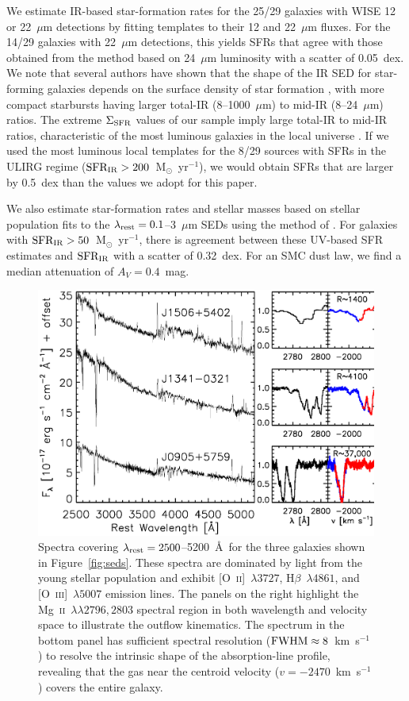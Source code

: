 \documentclass[apj]{emulateapj}
\newcommand{\kms}{km~s$^{-1}$}
\newcommand{\mgii}{\textrm{Mg}~\textsc{ii}}
\newcommand{\oii}{[\textrm{O}~\textsc{ii}]}
\newcommand{\oiii}{[\textrm{O}~\textsc{iii}]}
\newcommand{\msun}{M$_{\odot}$}
\newcommand{\lrest}{\lambda_{\textnormal{\scriptsize{rest}}}}
\newcommand{\sigmasfr}{\Sigma_{\textnormal{\scriptsize{SFR}}}}
\newcommand{\sfrir}{\textnormal{SFR}_{\textnormal{\scriptsize{IR}}}}
\begin{document}
We estimate IR-based star-formation rates for the 25/29 galaxies with
WISE 12 or 22~$\mu$m detections by fitting \citet{cha01} templates to
their 12 and 22~$\mu$m fluxes.  For the 14/29 galaxies with 22~$\mu$m
detections, this yields SFRs that agree with those obtained from the
\citet{ruj12} method based on 24~$\mu$m luminosity with a scatter of
0.05~dex.  We note that several authors have shown that the shape of
the IR SED for star-forming galaxies depends on the surface density of
star formation \citep[e.g.,][]{ruj11,elb11}, with more compact
starbursts having larger total-IR (8--1000~$\mu$m) to mid-IR
(8--24~$\mu$m) ratios.  The extreme $\sigmasfr$ values of our sample
imply large total-IR to mid-IR ratios, characteristic of the most
luminous galaxies in the local universe
\citep[e.g.,][]{cha01,dal02,rie09}.  If we used the most luminous
local templates for the 8/29 sources with SFRs in the ULIRG regime
($\sfrir>200$~\msun~yr$^{-1}$), we would obtain SFRs that are larger
by 0.5~dex than the values we adopt for this paper.

We also estimate star-formation rates and stellar masses based on
stellar population fits to the $\lrest=0.1$--3~$\mu$m SEDs using the
method of \citet{mou11}.  For galaxies with
$\sfrir>50$~\msun~yr$^{-1}$, there is agreement between these UV-based
SFR estimates and $\sfrir$ with a scatter of 0.32~dex.  For an SMC
dust law, we find a median attenuation of $A_V=0.4$~mag.

\begin{figure}[!t]
\includegraphics[angle=0,scale=0.41]{spectra.ps}
\caption{Spectra covering $\lrest=2500$--5200~\AA\ for the three
  galaxies shown in Figure~\ref{fig:seds}.  These spectra are
  dominated by light from the young stellar population and exhibit
  \oii~$\lambda3727$, H$\beta$~$\lambda4861$, and \oiii~$\lambda5007$
  emission lines.  The panels on the right highlight the
  \mgii~$\lambda\lambda2796,2803$ spectral region in both wavelength
  and velocity space to illustrate the outflow kinematics.  The
  spectrum in the bottom panel has sufficient spectral resolution
  ($\textnormal{FWHM}\approx8$~\kms) to resolve the intrinsic shape of
  the absorption-line profile, revealing that the gas near the
  centroid velocity ($v=-2470$~\kms) covers the entire galaxy.}
\label{fig:spectra}
\end{figure}
\end{document}
